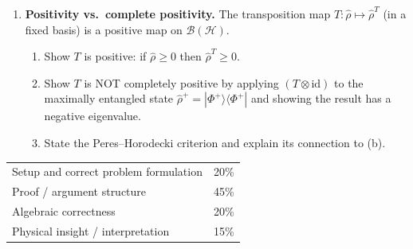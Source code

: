 \documentclass[11pt,a4paper]{article}
\begin{document}
\begin{tcolorbox}[gradprobbox, title={Part C --- Quantum Channels and Maps \hfill\normalfont 3 problems}]
\begin{enumerate}[leftmargin=1.8em, label=\textbf{C\arabic*.}, itemsep=12pt]
\item {}
  \textbf{Positivity vs.\ complete positivity.}
  The transposition map $T:\hat{\rho}\mapsto\hat{\rho}^T$ (in a fixed basis) is
  a positive map on $\mathcal{B}(\mathcal{H})$.
  \begin{enumerate}[label=(\alph*)]
    \item Show $T$ is positive: if $\hat{\rho}\ge 0$ then $\hat{\rho}^T\ge 0$.
    \item Show $T$ is NOT completely positive by applying
          $(T\otimes\mathrm{id})$ to the maximally entangled state
          $\hat{\rho}^+=|\Phi^+\rangle\langle\Phi^+|$ and showing the result
          has a negative eigenvalue.
    \item State the Peres--Horodecki criterion and explain its connection to (b).
  \end{enumerate}

\end{enumerate}
\end{tcolorbox}

\begin{tcolorbox}[rubricbox, title={SPSG Rubric (per problem)}]
\begin{tabular}{ll}
Setup and correct problem formulation & 20\%\\
Proof / argument structure            & 45\%\\
Algebraic correctness                 & 20\%\\
Physical insight / interpretation     & 15\%\\
\end{tabular}
\end{tcolorbox}
\end{document}
